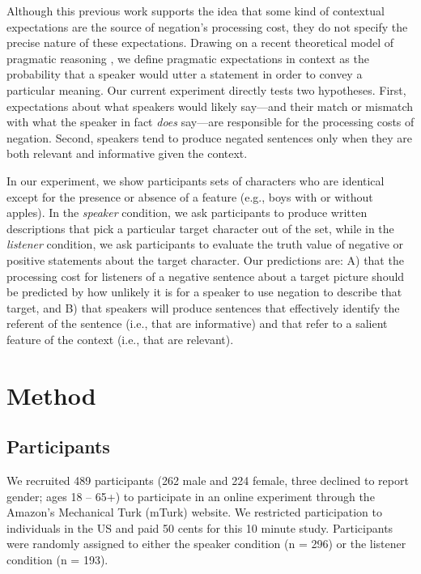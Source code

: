\documentclass[man, noapacite]{apa2}
\begin{document}
Although this previous work supports the idea that some kind of contextual expectations are the source of negation's processing cost, they do not specify the precise nature of these expectations. Drawing on a recent theoretical model of pragmatic reasoning \cite{frank2012}, we define pragmatic expectations in context as the probability that a speaker would utter a statement in order to convey a particular meaning. Our current experiment directly tests two hypotheses. First, expectations about what speakers would likely say---and their match or mismatch with what the speaker in fact \emph{does} say---are responsible for the processing costs of negation. Second, speakers tend to produce negated sentences only when they are both relevant and informative given the context.

In our experiment, we show participants sets of characters who are identical except for the presence or absence of a feature (e.g., boys with or without apples). In the \emph{speaker} condition, we ask participants to produce written descriptions that pick a particular target character out of the set, while in the \emph{listener} condition, we ask participants to evaluate the truth value of negative or positive statements about the target character. Our predictions are: A) that the processing cost for listeners of a negative sentence about a target picture should be predicted by how unlikely it is for a speaker to use negation to describe that target, and B) that speakers will produce sentences that effectively identify the referent of the sentence (i.e., that are informative) and that refer to a salient feature of the context (i.e., that are relevant).  

\section{Method}

\subsection{Participants} 

We recruited 489 participants (262 male and 224 female, three declined to report gender; ages 18 -- 65+) to participate in an online experiment through the Amazon's Mechanical Turk (mTurk) website.  We restricted participation to individuals in the US and paid 50 cents for this 10 minute study.  Participants were randomly assigned to either the speaker condition (n = 296) or the listener condition (n = 193).
\end{document}
